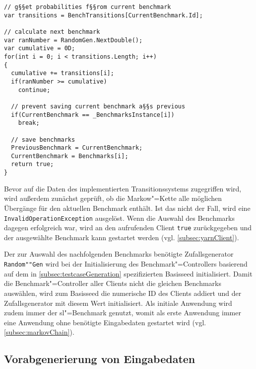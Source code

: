 \begin{lstlisting}[label=lst:benchmarkChanging,style=cs,
caption={[Auswahl des nachfolgenden Benchmarks]
    Auswahl des nachfolgenden Benchmarks (gekürzt).
    Dies stellt einen Ausschnitt der Methode \texttt{ChangeBenchmark()} dar, welche vom Client zur Bestimmung des nachfolgenden Benchmarks aufgerufen wird (vgl. \cref{subsec:yarnClient}).}]
// g§§et probabilities f§§rom current benchmark
var transitions = BenchTransitions[CurrentBenchmark.Id];

// calculate next benchmark
var ranNumber = RandomGen.NextDouble();
var cumulative = 0D;
for(int i = 0; i < transitions.Length; i++)
{
  cumulative += transitions[i];
  if(ranNumber >= cumulative)
    continue;
  
  // prevent saving current benchmark a§§s previous
  if(CurrentBenchmark == _BenchmarksInstance[i])
    break;
  
  // save benchmarks
  PreviousBenchmark = CurrentBenchmark;
  CurrentBenchmark = Benchmarks[i];
  return true;
}
\end{lstlisting}

Bevor auf die Daten des implementierten Transitionssystems zugegriffen wird, wird außerdem zunächst geprüft, ob die Markow"=Kette alle möglichen Übergänge für den aktuellen Benchmark enthält.
Ist das nicht der Fall, wird eine \texttt{InvalidOperationException} ausgelöst.
Wenn die Auswahl des Benchmarks dagegen erfolgreich war, wird an den aufrufenden Client \texttt{true} zurückgegeben und der ausgewählte Benchmark kann gestartet werden (vgl. \cref{subsec:yarnClient}).

Der zur Auswahl des nachfolgenden Benchmarks benötigte Zufallsgenerator \texttt{Random""Gen} wird bei der Initialisierung des Benchmark"=Controllers basierend auf dem in \cref{subsec:testcaseGeneration} spezifizierten Basisseed initialisiert.
Damit die Benchmark"=Controller aller Clients nicht die gleichen Benchmarks auswählen, wird zum Basisseed die numerische ID des Clients addiert und der Zufallsgenerator mit diesem Wert initialisiert.
Als initiale Anwendung wird zudem immer der \acl{sl}"=Benchmark genutzt, womit als erste Anwendung immer eine Anwendung ohne benötigte Eingabedaten gestartet wird (vgl. \cref{subsec:markovChain}).

\subsection{Vorabgenerierung von Eingabedaten}
\label{subsec:precreateInputData}


